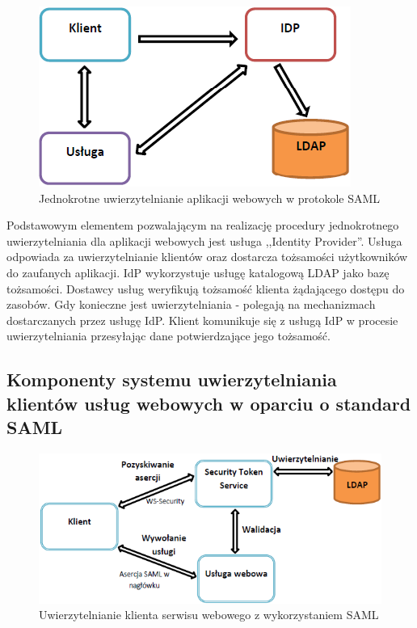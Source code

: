 		\begin{figure}[h]
			\centering
			\includegraphics{img/samlWeb.png}
			\caption{Jednokrotne uwierzytelnianie aplikacji webowych w protokole SAML}
			\label{webSSO}
		\end{figure}

		Podstawowym elementem pozwalającym na realizację procedury jednokrotnego uwierzytelniania dla aplikacji webowych jest usługa ,,Identity Provider''. Usługa odpowiada za uwierzytelnianie klientów oraz dostarcza tożsamości użytkowników do zaufanych aplikacji. IdP wykorzystuje usługę katalogową LDAP jako bazę tożsamości. Dostawcy usług weryfikują tożsamość klienta żądającego dostępu do zasobów. Gdy konieczne jest uwierzytelniania - polegają na mechanizmach dostarczanych przez usługę IdP. Klient komunikuje się z usługą IdP w procesie uwierzytelniania przesyłając dane potwierdzające jego tożsamość.

	\subsection{Komponenty systemu uwierzytelniania klientów usług webowych w oparciu o standard SAML}

		\begin{figure}[h]
			\centering
			\includegraphics{img/samlWS.png}
			\caption{Uwierzytelnianie klienta serwisu webowego z wykorzystaniem SAML}
			\label{Uwierzytelnianie klienta serwisu webowego z wykorzystaniem SAML}
		\end{figure}

